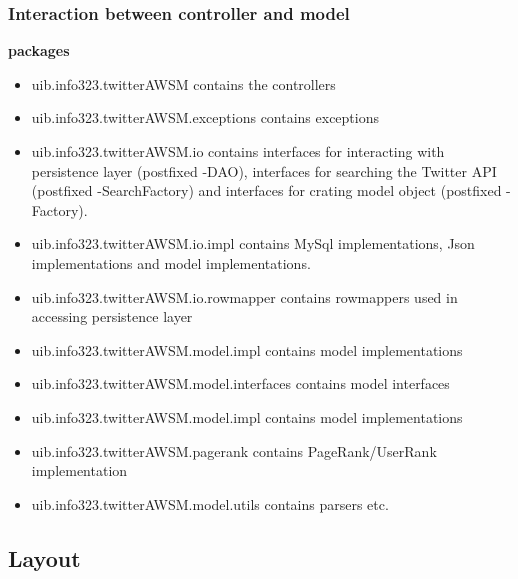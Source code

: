 \subsubsection{Interaction between controller and model} %
{\bf packages}
\begin{itemize}
  \item uib.info323.twitterAWSM contains the controllers
  \item uib.info323.twitterAWSM.exceptions contains exceptions
  \item uib.info323.twitterAWSM.io contains interfaces for interacting with persistence layer (postfixed -DAO), interfaces for searching the Twitter API (postfixed -SearchFactory) and interfaces for crating model object (postfixed -Factory).
  \item uib.info323.twitterAWSM.io.impl contains MySql implementations, Json implementations and model implementations. 
  \item uib.info323.twitterAWSM.io.rowmapper contains rowmappers used in accessing persistence layer
  \item uib.info323.twitterAWSM.model.impl contains model implementations
  \item uib.info323.twitterAWSM.model.interfaces contains model interfaces
  \item uib.info323.twitterAWSM.model.impl contains model implementations
  \item uib.info323.twitterAWSM.pagerank contains PageRank/UserRank implementation
  \item uib.info323.twitterAWSM.model.utils contains parsers etc.
\end{itemize}


\subsection{Layout} %

